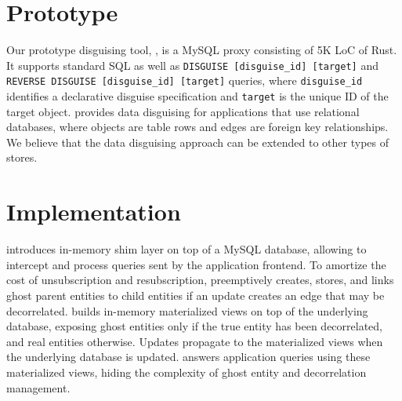 \section{Prototype}
\label{sec:proto}
%
Our prototype disguising tool, \sys, is a MySQL proxy consisting of 5K LoC of Rust.
%
It supports standard SQL as well as \texttt{DISGUISE [disguise\_id] [target]} and
\texttt{REVERSE DISGUISE [disguise\_id] [target]} queries, where \texttt{disguise\_id}
identifies a declarative disguise specification and \texttt{target} is the unique ID
of the target object.
%
\sys provides data disguising for applications that use relational databases, where
objects are table rows and edges are foreign key relationships.
%
We believe that the data disguising approach can be extended to other types of stores.
%

%
\iffalse
\section{Implementation}

\name introduces in-memory shim layer on top of a MySQL database,
allowing \name to intercept and process queries sent by the application frontend.
To amortize the cost of unsubscription and resubscription, \name preemptively creates, stores, and
links ghost parent entities to child entities if an update creates an edge that may be decorrelated.
\name builds in-memory materialized views on top of the underlying database, exposing ghost
entities only if the true entity has been decorrelated, and real entities otherwise. Updates
propagate to the materialized views when the underlying database is updated. \name answers
application queries using these materialized views, hiding the complexity of ghost entity and
decorrelation management.

